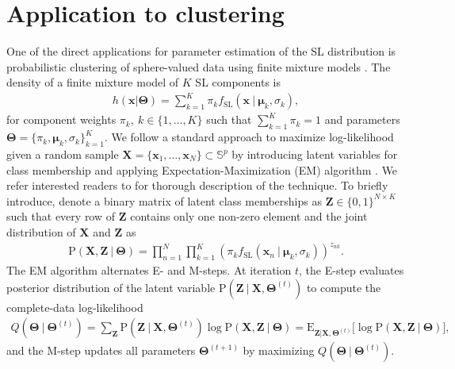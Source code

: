\documentclass[10pt]{article}
\newcommand{\bfx}{\mathbf{x}}
\newcommand{\bfmu}{\boldsymbol{\mu}}
\newcommand{\bfX}{\mathbf{X}}
\newcommand{\bfZ}{\mathbf{Z}}
\newcommand{\bfTheta}{\mathbf{\Theta}}
\newcommand{\bbS}{\mathbb{S}}
\newcommand{\rmE}{\textrm{E}}
\newcommand{\rmP}{\textrm{P}}
\newcommand{\fSL}{f_{\textrm{SL}}}
\begin{document}
\section{Application to clustering}\label{sec5:clustering}

One of the direct applications for parameter estimation of the SL distribution is probabilistic clustering of sphere-valued data using finite mixture models \cite{mclachlan_2019_FiniteMixtureModels}. The density of a finite mixture model of $K$ SL components is 
\begin{eqnarray*}
	h(\bfx | \mathbf{\Theta}) = \sum_{k=1}^K \pi_k \fSL(\bfx~|~\bfmu_k, \sigma_k),
\end{eqnarray*}
for component weights $\pi_k,~k\in\lbrace 1,\ldots, K\rbrace$ such that $\sum_{k=1}^K \pi_k = 1$ and parameters $\bfTheta = \lbrace \pi_k, \bfmu_k, \sigma_k\rbrace_{k=1}^K$. We follow a standard approach to maximize log-likelihood given a random sample $\bfX = \lbrace \bfx_1, \ldots, \bfx_N\rbrace \subset \bbS^p$ by introducing latent variables for class membership and applying  Expectation-Maximization (EM) algorithm \cite{dempster_1977_MaximumLikelihoodIncomplete}. We refer interested readers to \cite{bishop_2006_PatternRecognitionMachine} for thorough description of the technique. To briefly introduce, denote a binary matrix of latent class memberships as $\bfZ \in \lbrace 0, 1\rbrace^{N\times K}$ such that every row of $\bfZ$ contains only one non-zero element and the joint distribution of $\bfX$ and $\bfZ$ as
\begin{eqnarray*}
	\rmP(\bfX,\bfZ~|~\bfTheta) = \prod_{n=1}^N \prod_{k=1}^K \left( \pi_k \fSL(\bfx_n~|~\bfmu_k, \sigma_k)\right)^{z_{nk}}.
\end{eqnarray*}
The EM algorithm alternates E- and M-steps. At iteration $t$, the E-step evaluates posterior distribution of the latent variable  $\rmP(\bfZ~|~\bfX,\bfTheta^{(t)})$ to compute the complete-data log-likelihood
\begin{eqnarray*}
	Q(\bfTheta~|~\bfTheta^{(t)}) = \sum_{\bfZ} \rmP(\bfZ~|~\bfX, \bfTheta^{(t)}) \log \rmP (\bfX, \bfZ~|~\bfTheta) = \rmE_{\bfZ|\bfX, \bfTheta^{(t)}} \lbrack \log \rmP(\bfX, \bfZ~|~\bfTheta) \rbrack,
\end{eqnarray*}
and the M-step updates all parameters $\bfTheta^{(t+1)}$ by maximizing $Q(\bfTheta~|~\bfTheta^{(t)})$. 
\end{document}
